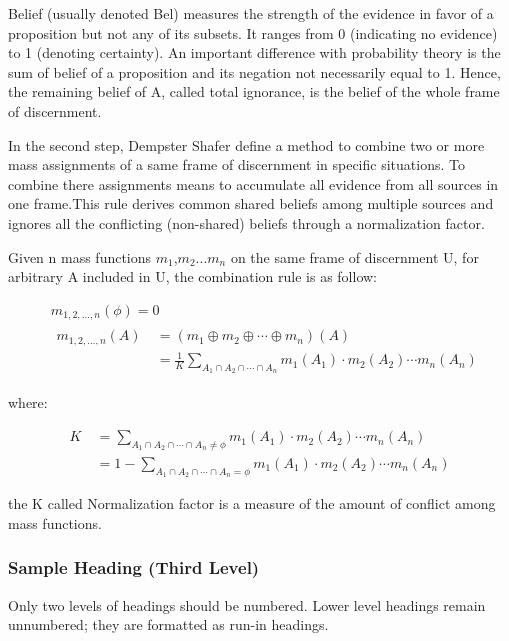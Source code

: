 \documentclass[runningheads]{llncs}
\begin{document}
Belief (usually denoted Bel) measures the strength of the evidence in favor of a proposition but not any of its subsets. It ranges from 0 (indicating no evidence) to 1 (denoting certainty). An important difference with probability theory is the sum of belief of a proposition and its negation not necessarily equal to 1. Hence, the remaining belief of A, called total ignorance, is the belief of the whole frame of discernment.

In the second step, Dempster Shafer define a method to combine two or more mass assignments of a same frame of discernment in specific situations. To combine there assignments means to accumulate all evidence from all sources in one frame.This rule derives common shared beliefs among multiple sources and ignores all the conflicting (non-shared) beliefs through a normalization factor. 

Given n mass functions $m_1$,$m_2$...$m_n$ on the same frame of discernment U, for arbitrary A  included in U, the combination rule is as follow:


\begin{equation}
\begin{split}
&\ m_{1,2,...,n}(\phi) = 0\\
&\ 
\begin{split}
m_{1,2,...,n}(A)  &\ =(m_1\oplus m_2 \oplus \cdots 
\oplus m_n)(A) \\
&\ = \frac{1}{K} \sum_{A_1 \cap A_2 \cap \cdots
\cap A_n} m_1(A_1) \cdot m_2(A_2) \cdots m_n(A_n)
\end{split}
\end{split}
\end{equation}

where:

\begin{equation}
\begin{split}
K &\ = \sum_{A_1 \cap A_2 \cap \cdots
\cap A_n \ne \phi} m_1(A_1) \cdot m_2(A_2) \cdots m_n(A_n) \\
&\ = 1 - \sum_{A_1 \cap A_2 \cap \cdots
\cap A_n = \phi} m_1(A_1) \cdot m_2(A_2) \cdots m_n(A_n) 
\end{split}
\end{equation}

the K called Normalization factor is a measure of the amount of conflict among mass functions. 


\subsubsection{Sample Heading (Third Level)} Only two levels of
headings should be numbered. Lower level headings remain unnumbered;
they are formatted as run-in headings.
\end{document}
